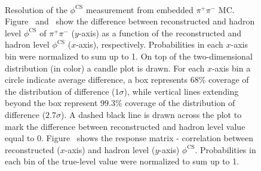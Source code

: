 \begin{figure}[h]
{  \centering
  \begin{subfigure}[b]{\linewidth}\addtocounter{subfigure}{-2}\vspace*{-12pt}
  \end{subfigure}\\
    \begin{minipage}[t][1.042\linewidth][t]{\linewidth}\vspace{10pt}
    \caption[Resolution of the $\phi^{\text{CS}}$ measurement from embedded $\pi^{+}\pi^{-}$ MC.]{Resolution of the $\phi^{\text{CS}}$ measurement from embedded $\pi^{+}\pi^{-}$ MC. Figure~ and~ show the difference between reconstructed and hadron level $\phi^{\text{CS}}$ of $\pi^{+}\pi^{-}$ ($y$-axis) as a function of the reconstructed and hadron level $\phi^{\text{CS}}$ ($x$-axis), respectively. Probabilities in each $x$-axis bin were normalized to sum up to 1. On top of the two-dimensional distribution (in color) a candle plot is drawn. For each $x$-axis bin a circle indicate average difference, a box represents 68\% coverage of the distribution of difference ($1\sigma$), while vertical lines extending beyond the box represent 99.3\% coverage of the distribution of difference ($2.7\sigma$). A dashed black line is drawn across the plot to mark the difference between reconstructed and hadron level value equal to 0. Figure~ shows the response matrix - correlation between reconstructed ($x$-axis) and hadron level ($y$-axis) $\phi^{\text{CS}}$. Probabilities in each bin of the true-level value were normalized to sum up to 1.}\label{fig:Response_PhiCS}%
  \end{minipage}
}%
\end{figure}



